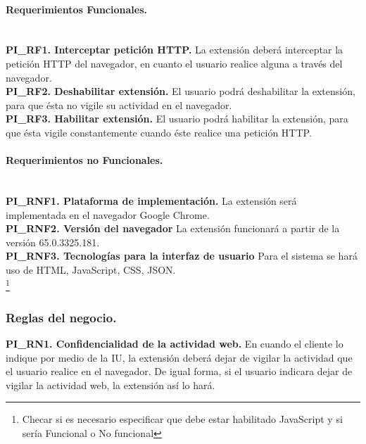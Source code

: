 \documentclass[12pt, a4paper, titlepage]{article}
\begin{document}
				\paragraph{Requerimientos Funcionales.\\ \\}
				
				{\setlength{\parindent}{12pt}
				\textbf{PI\_RF1. Interceptar petición HTTP.} La extensión deberá interceptar la petición HTTP del navegador, en cuanto el usuario realice alguna a través del navegador.\\

				\textbf{PI\_RF2. Deshabilitar extensión.} El usuario podrá deshabilitar la extensión, para que ésta no vigile su actividad en el navegador.\\
				
				\textbf{PI\_RF3. Habilitar extensión.} El usuario podrá habilitar la extensión, para que ésta vigile constantemente cuando éste realice una petición HTTP.
				}
				
				\paragraph{Requerimientos no Funcionales.\\ \\}
				{\setlength{\parindent}{12pt}
				
				\textbf{PI\_RNF1. Plataforma de implementación.} La extensión será implementada en el navegador Google Chrome.\\
				
				\textbf{PI\_RNF2. Versión del navegador} La extensión funcionará a partir de la versión 65.0.3325.181.\\
				
				\textbf{PI\_RNF3. Tecnologías para la interfaz de usuario} Para el sistema se hará uso de HTML, JavaScript, CSS, JSON.\\
				\footnote{Checar si es necesario especificar que debe estar habilitado JavaScript y si sería Funcional o No funcional}
				
				}
			
			\subsubsection{Reglas del negocio.}
				{\setlength{\parindent}{12pt}
					
				\label{PI_RN1}
				\textbf{PI\_RN1. Confidencialidad de la actividad web.} En cuando el cliente lo indique por medio de la IU, la extensión deberá dejar de vigilar la actividad que el usuario realice en el navegador. De igual forma, si el usuario indicara dejar de vigilar la actividad web, la extensión así lo hará.\\
					
				}\newpage
	\newpage
\end{document}
